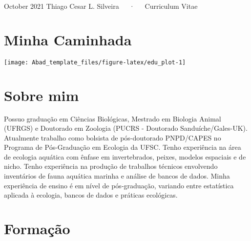 \documentclass[11pt, a4paper]{awesome-cv}
\begin{document}
\makecvheader

\makecvfooter
  {October 2021}
    {Thiago Cesar L. Silveira~~~·~~~Curriculum Vitae}
  {\thepage}





\hypertarget{minha-caminhada}{%
\section{Minha Caminhada}\label{minha-caminhada}}

\begin{center}\texttt{[image: Abad\_template\_files/figure-latex/edu\_plot-1]} \end{center}

\hypertarget{sobre-mim}{%
\section{Sobre mim}\label{sobre-mim}}

Possuo graduação em Ciências Biológicas, Mestrado em Biologia Animal
(UFRGS) e Doutorado em Zoologia (PUCRS - Doutorado Sanduíche/Gales-UK).
Atualmente trabalho como bolsista de pós-doutorado PNPD/CAPES no
Programa de Pós-Graduação em Ecologia da UFSC. Tenho experiência na área
de ecologia aquática com ênfase em invertebrados, peixes, modelos
espaciais e de nicho. Tenho experiência na produção de trabalhos
técnicos envolvendo inventários de fauna aquática marinha e análise de
bancos de dados. Minha experiência de ensino é em nível de
pós-graduação, variando entre estatística aplicada à ecologia, bancos de
dados e práticas ecológicas.

\hypertarget{formauxe7uxe3o}{%
\section{Formação}\label{formauxe7uxe3o}}
\end{document}
